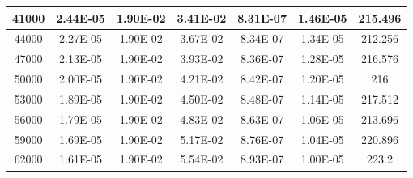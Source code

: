 \documentclass[11pt, a4paper, twocolumn]{article}
\begin{document}
\begin{table}[H]
{\begin{tabular}{|c|c|c|c|c|c|c|}
41000          & 2.44E-05               & 1.90E-02                      & 3.41E-02        & 8.31E-07            & 1.46E-05     & 215.496     \\ \hline
44000          & 2.27E-05               & 1.90E-02                      & 3.67E-02        & 8.34E-07            & 1.34E-05     & 212.256     \\ \hline
47000          & 2.13E-05               & 1.90E-02                      & 3.93E-02        & 8.36E-07            & 1.28E-05     & 216.576     \\ \hline
50000          & 2.00E-05               & 1.90E-02                      & 4.21E-02        & 8.42E-07            & 1.20E-05     & 216         \\ \hline
53000          & 1.89E-05               & 1.90E-02                      & 4.50E-02        & 8.48E-07            & 1.14E-05     & 217.512     \\ \hline
56000          & 1.79E-05               & 1.90E-02                      & 4.83E-02        & 8.63E-07            & 1.06E-05     & 213.696     \\ \hline
59000          & 1.69E-05               & 1.90E-02                      & 5.17E-02        & 8.76E-07            & 1.04E-05     & 220.896     \\ \hline
62000          & 1.61E-05               & 1.90E-02                      & 5.54E-02        & 8.93E-07            & 1.00E-05     & 223.2       \\ \hline
\end{tabular}%
}
\end{table}
\end{document}
